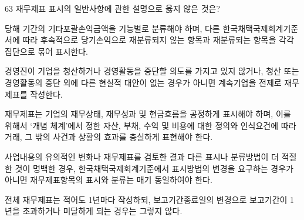 \begin{question}{63}
재무제표 표시의 일반사항에 관한 설명으로 옳지 않은 것은?
\begin{choices}
  \item 당해 기간의 기타포괄손익금액을 기능별로 분류해야 하며, 다른 한국채택국제회계기준서에 따라 후속적으로 당기손익으로 재분류되지 않는 항목과 재분류되는 항목을 각각 집단으로 묶어 표시한다.
  \item 경영진이 기업을 청산하거나 경영활동을 중단할 의도를 가지고 있지 않거나, 청산 또는 경영활동의 중단 외에 다른 현실적 대안이 없는 경우가 아니면 계속기업을 전제로 재무제표를 작성한다.
  \item 재무제표는 기업의 재무상태, 재무성과 및 현금흐름을 공정하게 표시해야 하며, 이를 위해서 ‘개념 체계’에서 정한 자산, 부채, 수익 및 비용에 대한 정의와 인식요건에 따라 거래, 그 밖의 사건과 상황의 효과를 충실하게 표현해야 한다.
  \item 사업내용의 유의적인 변화나 재무제표를 검토한 결과 다른 표시나 분류방법이 더 적절한 것이 명백한 경우, 한국채택국제회계기준에서 표시방법의 변경을 요구하는 경우가 아니면 재무제표항목의 표시와 분류는 매기 동일하여야 한다.
  \item 전체 재무제표는 적어도 1년마다 작성하되, 보고기간종료일의 변경으로 보고기간이 1년을 초과하거나 미달하게 되는 경우는 그렇지 않다.
\end{choices}
\end{question}
